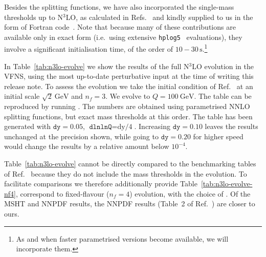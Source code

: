 Besides the splitting functions, we have also incorporated the
single-mass thresholds up to N$^3$LO, as calculated in
Refs.~\cite{Bierenbaum:2009mv,Ablinger:2010ty,Kawamura:2012cr,Blumlein:2012vq,ABLINGER2014263,Ablinger:2014nga,Ablinger:2014vwa,Behring:2014eya,Ablinger:2019etw,Behring:2021asx,Ablinger:2023ahe,Ablinger:2024xtt}
and kindly supplied to us in the form of Fortran
code~\cite{BlumleinCode,Fael:2022miw}.
%
Note that because many of these contributions are available only in
exact form (i.e.\ using extensive \texttt{hplog5}~\cite{FortranPolyLog} evaluations), they
involve a significant initialisation time, of the order of
$10{-}30\,\text{s}$.\footnote{As and when faster 
  parametrised versions become available, we will incorporate them.}

In Table~\ref{tab:n3lo-evolve} we show the results of the full N$^3$LO
evolution in the VFNS, using the most up-to-date perturbative input at
the time of writing this release note. To assess the evolution we take
the initial condition of Ref.~\cite{Dittmar:2005ed} at an initial
scale $\sqrt{2}~\text{GeV}$ and $n_f=3$. We evolve to
$Q=100~\text{GeV}$. The table can be reproduced by running
. The
numbers are obtained using parametrised NNLO splitting functions, but
exact mass thresholds at this order.
%
The table has been generated with $\texttt{dy}=0.05$,
$\texttt{dlnlnQ}=\text{dy/4}$.
%
Increasing $\texttt{dy}=0.10$ leaves the results unchanged at the
precision shown, while going to $\texttt{dy}=0.20$ for higher speed
would change the results by a relative amount below $10^{-4}$.

Table~\ref{tab:n3lo-evolve} cannot be directly compared to the
benchmarking tables of Ref.~\cite{Cooper-Sarkar:2024crx} because they
do not include the mass thresholds in the \ntlo evolution.
%
To facilitate comparisons we therefore additionally provide
Table~\ref{tab:n3lo-evolve-nf4}, correspond to fixed-flavour ($n_f=4$)
evolution, with the choice of
.
%
Of the MSHT and NNPDF results, the NNPDF results (Table~2 of
Ref.~\cite{Cooper-Sarkar:2024crx}) are closer to ours.



